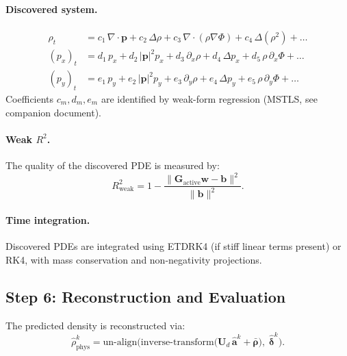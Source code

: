 \documentclass[11pt]{article}
\newcommand{\ba}{\mathbf{a}}
\newcommand{\bp}{\mathbf{p}}
\newcommand{\brho}{\boldsymbol{\rho}}
\newcommand{\Rtwo}{R^2}
\begin{document}
\paragraph{Discovered system.}
\begin{align}
  \rho_t &= c_1\,\nabla\cdot\bp + c_2\,\Delta\rho
    + c_3\,\nabla\cdot(\rho\nabla\Phi) + c_4\,\Delta(\rho^2) + \ldots \\
  (p_x)_t &= d_1\,p_x + d_2\,|\bp|^2 p_x + d_3\,\partial_x\rho
    + d_4\,\Delta p_x + d_5\,\rho\,\partial_x\Phi + \ldots \\
  (p_y)_t &= e_1\,p_y + e_2\,|\bp|^2 p_y + e_3\,\partial_y\rho
    + e_4\,\Delta p_y + e_5\,\rho\,\partial_y\Phi + \ldots
\end{align}
Coefficients $c_m, d_m, e_m$ are identified by weak-form regression
(MSTLS, see companion document).

\paragraph{Weak $\Rtwo$.}
The quality of the discovered PDE is measured by:
\begin{equation}
  \Rtwo_{\text{weak}} = 1 - \frac{\|\mathbf{G}_{\text{active}}\mathbf{w} - \mathbf{b}\|^2}{\|\mathbf{b}\|^2}.
\end{equation}

\paragraph{Time integration.}
Discovered PDEs are integrated using ETDRK4 (if stiff linear terms
present) or RK4, with mass conservation and non-negativity projections.


\subsection{Step 6: Reconstruction and Evaluation}

The predicted density is reconstructed via:
\begin{equation}
  \hat{\rho}^k_{\text{phys}} = \text{un-align}\bigl(
    \text{inverse-transform}\bigl(
      \mathbf{U}_d\,\hat{\ba}^k + \bar{\brho}
    \bigr),\; \hat{\boldsymbol{\delta}}^k
  \bigr).
\end{equation}
\end{document}

